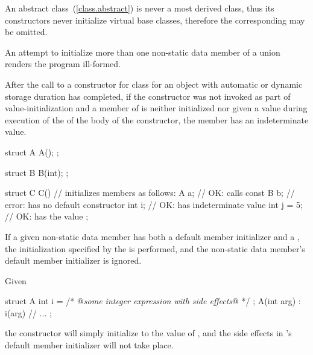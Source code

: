 \begin{note} An abstract class~(\ref{class.abstract}) is never a most derived
class, thus its constructors never initialize virtual base classes, therefore the
corresponding  may be omitted. \end{note}
An attempt to initialize more than one non-static data member of a union renders the
program ill-formed.
%
%
\begin{note}
After the call to a constructor for class
for an object with automatic or dynamic storage duration
has completed, if
the constructor was not invoked as part of value-initialization and
a member of
is neither initialized nor
given a value
during execution of the  of the body of the constructor,
the member has an indeterminate value.
\end{note}
\begin{example}
\begin{codeblock}
struct A {
  A();
};

struct B {
  B(int);
};

struct C {
  C() { }               // initializes members as follows:
  A a;                    // OK: calls 
  const B b;              // error:  has no default constructor
  int i;                  // OK:  has indeterminate value
  int j = 5;              // OK:  has the value 
};
\end{codeblock}
\end{example}

\pnum
If a given non-static data member has both a default member initializer
and a , the initialization specified by the
 is performed, and the non-static data member's 
default member initializer is ignored.
\begin{example} Given
\begin{codeblock}
struct A {
  int i = /* @\textrm{\textit{some integer expression with side effects}}@ */ ;
  A(int arg) : i(arg) { }
  // ...
};
\end{codeblock}

the  constructor will simply initialize  to the value of
, and the
%
side effects in 's default member initializer 
will not take place.
\end{example}

